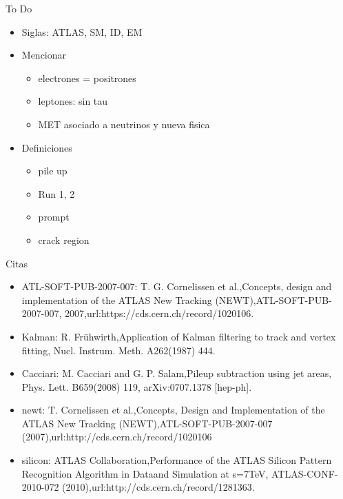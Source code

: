 
{\LARGE To Do}

\begin{itemize}
	\item Siglas: ATLAS, SM, ID, EM
	\item Mencionar
	\begin{itemize}
		\item electrones = positrones
		\item leptones: sin tau
		\item MET asociado a neutrinos y nueva fisica
	\end{itemize}
	\item Definiciones
	\begin{itemize}
		\item pile up
		\item Run 1, 2
		\item prompt
		\item crack region
	\end{itemize}
\end{itemize}


\vspace{2cm}


{\LARGE Citas}

\begin{itemize}
	\item ATL-SOFT-PUB-2007-007: T. G. Cornelissen et al.,Concepts, design and implementation of the ATLAS New Tracking (NEWT),ATL-SOFT-PUB-2007-007, 2007,url:https://cds.cern.ch/record/1020106.
	\item Kalman: R. Frühwirth,Application of Kalman filtering to track and vertex fitting, Nucl. Instrum. Meth. A262(1987) 444.
	\item Cacciari: M. Cacciari and G. P. Salam,Pileup subtraction using jet areas, Phys. Lett. B659(2008) 119, arXiv:0707.1378 [hep-ph].
	\item newt: T. Cornelissen et al.,Concepts, Design and Implementation of the ATLAS New Tracking (NEWT),ATL-SOFT-PUB-2007-007 (2007),url:http://cds.cern.ch/record/1020106
	\item silicon: ATLAS Collaboration,Performance of the ATLAS Silicon Pattern Recognition Algorithm in Dataand Simulation at s=7TeV, ATLAS-CONF-2010-072 (2010),url:http://cds.cern.ch/record/1281363.
\end{itemize}



